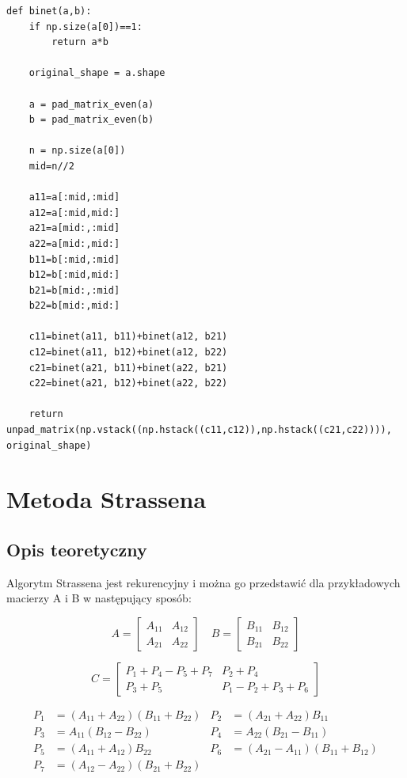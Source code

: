 \documentclass{article}
\begin{document}
\begin{verbatim}
def binet(a,b):
    if np.size(a[0])==1:
        return a*b
    
    original_shape = a.shape
    
    a = pad_matrix_even(a)
    b = pad_matrix_even(b)
    
    n = np.size(a[0])
    mid=n//2
    
    a11=a[:mid,:mid]
    a12=a[:mid,mid:]
    a21=a[mid:,:mid]
    a22=a[mid:,mid:]
    b11=b[:mid,:mid]
    b12=b[:mid,mid:]
    b21=b[mid:,:mid]
    b22=b[mid:,mid:]

    c11=binet(a11, b11)+binet(a12, b21)
    c12=binet(a11, b12)+binet(a12, b22)
    c21=binet(a21, b11)+binet(a22, b21)
    c22=binet(a21, b12)+binet(a22, b22)

    return unpad_matrix(np.vstack((np.hstack((c11,c12)),np.hstack((c21,c22)))), original_shape)
\end{verbatim}

\section{Metoda Strassena}

\subsection{Opis teoretyczny}

Algorytm Strassena jest rekurencyjny i można go przedstawić dla przykładowych macierzy A i B w następujący sposób:

\[
A =
\begin{bmatrix}
A_{11} & A_{12} \\
A_{21} & A_{22}
\end{bmatrix}
\quad
B =
\begin{bmatrix}
B_{11} & B_{12} \\
B_{21} & B_{22}
\end{bmatrix}
\]

\[
C =
\begin{bmatrix}
P_{1} + P_{4} - P_{5} + P_{7} & P_{2} + P_{4} \\
P_{3} + P_{5} & P_{1} - P_{2} + P_{3} + P_{6}
\end{bmatrix}
\]

\[
\begin{aligned}
P_1 & = (A_{11} + A_{22})(B_{11} + B_{22}) & P_2 & = (A_{21} + A_{22})B_{11} \\
P_3 & = A_{11}(B_{12} - B_{22}) & P_4 & = A_{22}(B_{21} - B_{11}) \\
P_5 & = (A_{11} + A_{12})B_{22} & P_6 & = (A_{21} - A_{11})(B_{11} + B_{12}) \\
P_7 & = (A_{12} - A_{22})(B_{21} + B_{22}) &
\end{aligned}
\]
\end{document}
